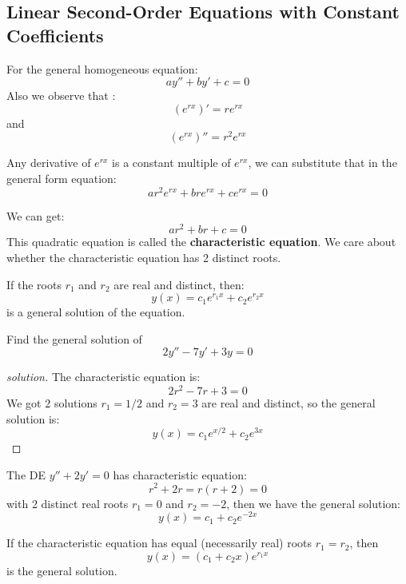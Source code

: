 \subsection{Linear Second-Order Equations with Constant Coefficients}

For the general homogeneous equation:
\[
    ay'' + by' + c = 0
\]
Also we observe that :
\[
    (e^{rx})' = re^{rx}
\]
and
\[
    (e^{rx})'' = r^2 e^{rx}
\]

Any derivative of \(e^{rx}\) is a constant multiple of \(e^{rx}\), we can substitute that in the general form equation:
\[
    ar^2e^{rx} + bre^{rx} + ce^{rx} = 0
\]  

We can get:
\[
    ar^2 + br + c = 0
\]
This quadratic equation is called the \textbf{characteristic equation}. 
We care about whether the characteristic equation has 2 distinct roots.

\begin{theorem}
   If the roots \(r_1\) and  \(r_2\) are real and distinct, then:
   \[
    y(x) = c_1 e^{r_1x} + c_2 e^{r_2x}
   \] 
   is a general solution of the equation.
\end{theorem}

\begin{example}
   Find the general solution of
   \[
    2 y'' - 7y' + 3y = 0
   \] 
\end{example}
\begin{proof}[solution]
   The characteristic equation is:
   \[
        2r^2 - 7r + 3 = 0
   \] 
   We got 2 solutions \(r_1 = 1/2\) and \(r_2 = 3\) are real and distinct, so the general solution is:
   \[
    y(x) = c_1 e^{x/2} + c_2 e^{3x}
   \]  
\end{proof}

\begin{example}
    The DE \(y'' + 2y' = 0\) has characteristic equation:
    \[
        r^2 + 2r = r(r+2) = 0
    \] 
    with 2 distinct real roots \(r_1 = 0\) and \(r_2 = -2\), 
    then we have the general solution:
    \[
        y(x) = c_1 + c_2 e^{-2x}
    \]
\end{example}

\begin{theorem}
   If the characteristic equation has equal (necessarily real) roots \(r_1 = r_2\), then
   \[
        y(x) = (c_1 + c_2x)e^{r_1x} 
   \]  
   is the general solution.
\end{theorem}

